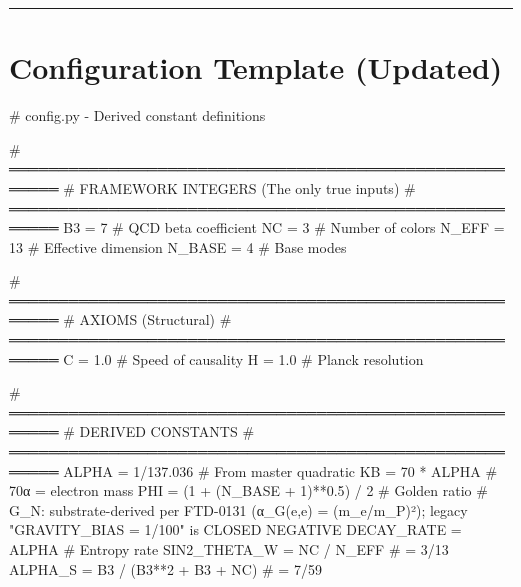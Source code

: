 \documentclass[
  11pt,
  letterpaper,
  twoside,
  openany]{book}
\makeatletter
\newenvironment{Shaded}{\begin{snugshade}}{\end{snugshade}}
\newcommand{\CommentTok}[1]{\textcolor[rgb]{0.37,0.37,0.37}{#1}}
\newcommand{\DecValTok}[1]{\textcolor[rgb]{0.68,0.00,0.00}{#1}}
\newcommand{\FloatTok}[1]{\textcolor[rgb]{0.68,0.00,0.00}{#1}}
\newcommand{\NormalTok}[1]{\textcolor[rgb]{0.00,0.23,0.31}{#1}}
\newcommand{\OperatorTok}[1]{\textcolor[rgb]{0.37,0.37,0.37}{#1}}
\let\orig@section\section
\renewcommand{\section}{\needspace{8\baselineskip}\orig@section}
\makeatother
\begin{document}
\begin{center}\rule{0.5\linewidth}{0.5pt}\end{center}

\section{Configuration Template
(Updated)}\label{configuration-template-updated}

\begin{Shaded}
\begin{Highlighting}[]
\CommentTok{\# config.py {-} Derived constant definitions}

\CommentTok{\# ═══════════════════════════════════════════════════════}
\CommentTok{\# FRAMEWORK INTEGERS (The only true inputs)}
\CommentTok{\# ═══════════════════════════════════════════════════════}
\NormalTok{B3 }\OperatorTok{=} \DecValTok{7}                    \CommentTok{\# QCD beta coefficient}
\NormalTok{NC }\OperatorTok{=} \DecValTok{3}                    \CommentTok{\# Number of colors}
\NormalTok{N\_EFF }\OperatorTok{=} \DecValTok{13}                \CommentTok{\# Effective dimension}
\NormalTok{N\_BASE }\OperatorTok{=} \DecValTok{4}                \CommentTok{\# Base modes}

\CommentTok{\# ═══════════════════════════════════════════════════════}
\CommentTok{\# AXIOMS (Structural)}
\CommentTok{\# ═══════════════════════════════════════════════════════}
\NormalTok{C }\OperatorTok{=} \FloatTok{1.0}                   \CommentTok{\# Speed of causality}
\NormalTok{H }\OperatorTok{=} \FloatTok{1.0}                   \CommentTok{\# Planck resolution}

\CommentTok{\# ═══════════════════════════════════════════════════════}
\CommentTok{\# DERIVED CONSTANTS}
\CommentTok{\# ═══════════════════════════════════════════════════════}
\NormalTok{ALPHA }\OperatorTok{=} \DecValTok{1}\OperatorTok{/}\FloatTok{137.036}                          \CommentTok{\# From master quadratic}
\NormalTok{KB }\OperatorTok{=} \DecValTok{70} \OperatorTok{*}\NormalTok{ ALPHA                            }\CommentTok{\# 70α = electron mass}
\NormalTok{PHI }\OperatorTok{=}\NormalTok{ (}\DecValTok{1} \OperatorTok{+}\NormalTok{ (N\_BASE }\OperatorTok{+} \DecValTok{1}\NormalTok{)}\OperatorTok{**}\FloatTok{0.5}\NormalTok{) }\OperatorTok{/} \DecValTok{2}          \CommentTok{\# Golden ratio}
\CommentTok{\# G\_N: substrate{-}derived per FTD{-}0131 (α\_G(e,e) = (m\_e/m\_P)²); legacy "GRAVITY\_BIAS = 1/100" is CLOSED NEGATIVE}
\NormalTok{DECAY\_RATE }\OperatorTok{=}\NormalTok{ ALPHA                         }\CommentTok{\# Entropy rate}
\NormalTok{SIN2\_THETA\_W }\OperatorTok{=}\NormalTok{ NC }\OperatorTok{/}\NormalTok{ N\_EFF                  }\CommentTok{\# = 3/13}
\NormalTok{ALPHA\_S }\OperatorTok{=}\NormalTok{ B3 }\OperatorTok{/}\NormalTok{ (B3}\OperatorTok{**}\DecValTok{2} \OperatorTok{+}\NormalTok{ B3 }\OperatorTok{+}\NormalTok{ NC)           }\CommentTok{\# = 7/59}
\end{Highlighting}
\end{Shaded}
\end{document}
